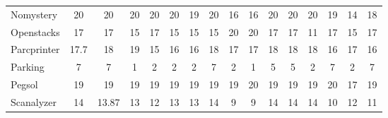 \begin{table}[htb]
\begin{tabular}{lccccccccccccccc}
Nomystery                & 20                                 & 20              & 20              & 20              & 20              & 19                              & 20                    & 16                   & 16                   & 20                     & 20                     & 20                              & 19                    & 14                      & 18                      \\
Openstacks               & 17                                 & 17              & 15              & 17              & 15              & 15                              & 15                    & 20                   & 20                   & 17                     & 17                     & 11                              & 17                    & 15                      & 17                      \\
Parcprinter              & 17.7                               & 18              & 19              & 15              & 16              & 16                              & 18                    & 17                   & 17                   & 18                     & 18                     & 18                              & 16                    & 17                      & 16                      \\
Parking                  & 7                                  & 7               & 1               & 2               & 2               & 2                               & 7                     & 2                    & 1                    & 5                      & 5                      & 2                               & 7                     & 2                       & 7                       \\
Pegsol                   & 19                                 & 19              & 19              & 19              & 19              & 19                              & 19                    & 19                   & 20                   & 19                     & 19                     & 19                              & 20                    & 17                      & 19                      \\
Scanalyzer               & 14                                 & 13.87           & 13              & 12              & 13              & 13                              & 14                    & 9                    & 9                    & 14                     & 14                     & 14                              & 10                    & 12                      & 11                      \\

\end{tabular}
\end{table}
